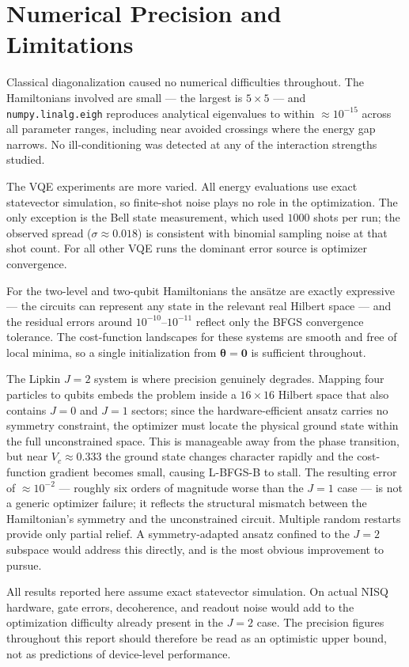 \section{Numerical Precision and Limitations}\label{sec:numerical-stability}

Classical diagonalization caused no numerical difficulties throughout. The Hamiltonians involved are small — the largest is $5\times5$ — and \texttt{numpy.linalg.eigh} reproduces analytical eigenvalues to within $\approx10^{-15}$ across all parameter ranges, including near avoided crossings where the energy gap narrows. No ill-conditioning was detected at any of the interaction strengths studied.

The VQE experiments are more varied. All energy evaluations use exact statevector simulation, so finite-shot noise plays no role in the optimization. The only exception is the Bell state measurement, which used $1000$ shots per run; the observed spread ($\sigma\approx0.018$) is consistent with binomial sampling noise at that shot count. For all other VQE runs the dominant error source is optimizer convergence.

For the two-level and two-qubit Hamiltonians the ansätze are exactly expressive — the circuits can represent any state in the relevant real Hilbert space — and the residual errors around $10^{-10}$--$10^{-11}$ reflect only the BFGS convergence tolerance. The cost-function landscapes for these systems are smooth and free of local minima, so a single initialization from $\boldsymbol{\theta}=\mathbf{0}$ is sufficient throughout.

The Lipkin $J=2$ system is where precision genuinely degrades. Mapping four particles to qubits embeds the problem inside a $16\times16$ Hilbert space that also contains $J=0$ and $J=1$ sectors; since the hardware-efficient ansatz carries no symmetry constraint, the optimizer must locate the physical ground state within the full unconstrained space. This is manageable away from the phase transition, but near $V_c\approx0.333$ the ground state changes character rapidly and the cost-function gradient becomes small, causing L-BFGS-B to stall. The resulting error of $\approx10^{-2}$ — roughly six orders of magnitude worse than the $J=1$ case — is not a generic optimizer failure; it reflects the structural mismatch between the Hamiltonian's symmetry and the unconstrained circuit. Multiple random restarts provide only partial relief. A symmetry-adapted ansatz confined to the $J=2$ subspace would address this directly, and is the most obvious improvement to pursue.

All results reported here assume exact statevector simulation. On actual NISQ hardware, gate errors, decoherence, and readout noise would add to the optimization difficulty already present in the $J=2$ case. The precision figures throughout this report should therefore be read as an optimistic upper bound, not as predictions of device-level performance.
